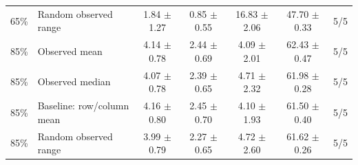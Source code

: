 \begin{table}[t]
{\begin{tabular}{llccccc}
65\% & Random observed range & 1.84 $\pm$ 1.27 & 0.85 $\pm$ 0.55 & 16.83 $\pm$ 2.06 & 47.70 $\pm$ 0.33 & 5/5 \\
85\% & Observed mean & 4.14 $\pm$ 0.78 & 2.44 $\pm$ 0.69 & 4.09 $\pm$ 2.01 & 62.43 $\pm$ 0.47 & 5/5 \\
85\% & Observed median & 4.07 $\pm$ 0.78 & 2.39 $\pm$ 0.65 & 4.71 $\pm$ 2.32 & 61.98 $\pm$ 0.28 & 5/5 \\
85\% & Baseline: row/column mean & 4.16 $\pm$ 0.80 & 2.45 $\pm$ 0.70 & 4.10 $\pm$ 1.93 & 61.50 $\pm$ 0.40 & 5/5 \\
85\% & Random observed range & 3.99 $\pm$ 0.79 & 2.27 $\pm$ 0.65 & 4.72 $\pm$ 2.60 & 61.62 $\pm$ 0.26 & 5/5 \\
\bottomrule
\end{tabular}
}
\end{table}
